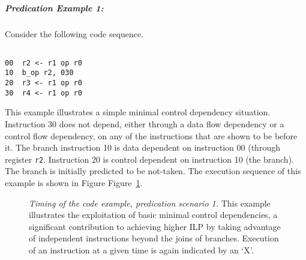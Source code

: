 \subparagraph{Predication Example 1: }
Consider the following code sequence.

\begin{verbatim}

00	r2 <- r1 op r0
10	b_op r2, 030
20	r3 <- r1 op r0
30	r4 <- r1 op r0

\end{verbatim}

This example illustrates a simple minimal control dependency
situation.
Instruction 30 does not depend, either through a data flow dependency
or a control flow dependency, on any of the instructions that
are shown to be before it.  The branch instruction 10 is data
dependent on instruction 00 (through register
{\tt r2}.
Instruction 20 is control
dependent on instruction 10 (the branch).
The branch is initially predicted to be not-taken.
The execution sequence of this example is shown
in Figure
Figure~\ref{pex1}.

\begin{figure}
\centering
{}
\caption{{\em Timing of the code example, predication scenario 1.}
This example illustrates the exploitation of basic minimal control
dependencies, a significant contribution to
achieving higher ILP by taking advantage of independent
instructions beyond the joins of branches.
Execution of an instruction at a given time is
again indicated by an `X'.}
\label{pex1}
\end{figure}

